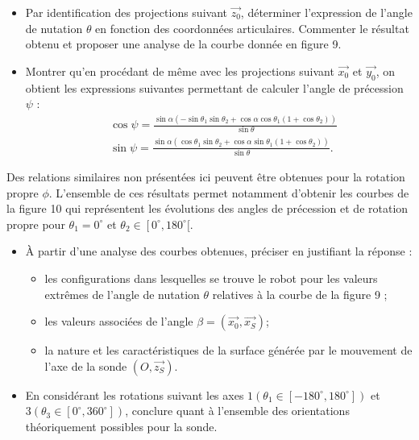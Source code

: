 \begin{itemize}
  \item[Q5.] Par identification des projections suivant $\overrightarrow{z_{0}}$, déterminer l'expression de l'angle de nutation $\theta$ en fonction des coordonnées articulaires. Commenter le résultat obtenu et proposer une analyse de la courbe donnée en figure 9.
  \item[Q6.] Montrer qu'en procédant de même avec les projections suivant $\overrightarrow{x_{0}}$ et $\overrightarrow{y_{0}}$, on obtient les expressions suivantes permettant de calculer l'angle de précession $\psi$ :
$$
\begin{aligned}
& \cos \psi=\frac{\sin \alpha\left(-\sin \theta_{1} \sin \theta_{2}+\cos \alpha \cos \theta_{1}\left(1+\cos \theta_{2}\right)\right)}{\sin \theta} \\
& \sin \psi=\frac{\sin \alpha\left(\cos \theta_{1} \sin \theta_{2}+\cos \alpha \sin \theta_{1}\left(1+\cos \theta_{2}\right)\right)}{\sin \theta} .
\end{aligned}
$$
\end{itemize}

Des relations similaires non présentées ici peuvent être obtenues pour la rotation propre $\phi$. L'ensemble de ces résultats permet notamment d'obtenir les courbes de la figure 10 qui représentent les évolutions des angles de précession et de rotation propre pour $\theta_{1}=0^{\circ}$ et $\theta_{2} \in\left[0^{\circ}, 180^{\circ}[\right.$.

\begin{itemize}
  \item[Q7.] À partir d'une analyse des courbes obtenues, préciser en justifiant la réponse :
  \begin{itemize}
    \item[a)] les configurations dans lesquelles se trouve le robot pour les valeurs extrêmes de l'angle de nutation $\theta$ relatives à la courbe de la figure 9 ;
    \item[b)] les valeurs associées de l'angle $\beta=\left(\overrightarrow{x_{0}}, \overrightarrow{x_{S}}\right)$;
    \item[c)] la nature et les caractéristiques de la surface générée par le mouvement de l'axe de la sonde $\left(O, \overrightarrow{z_{S}}\right)$.
  \end{itemize}
  \item[Q8.] En considérant les rotations suivant les axes $1\left(\theta_{1} \in\left[-180^{\circ}, 180^{\circ}\right]\right)$ et $3\left(\theta_{3} \in\left[0^{\circ}, 360^{\circ}\right]\right)$, conclure quant à l'ensemble des orientations théoriquement possibles pour la sonde.
\end{itemize}


